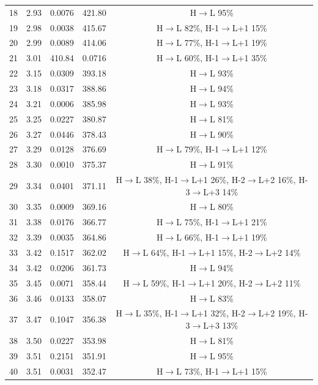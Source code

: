 \begin{table}[H]
{\begin{center}
\begin{tabular}{ccccc}
18 & 2.93 & 0.0076 & 421.80 &  H$\rightarrow$L 95\%  \\ 
19 & 2.98 & 0.0038 & 415.67 & H$\rightarrow$L 82\%, H-1$\rightarrow$L+1 15\% \\ 
20 & 2.99 & 0.0089 & 414.06 &  H$\rightarrow$L 77\%, H-1$\rightarrow$L+1 19\% \\ 
21 & 3.01 & 410.84 & 0.0716 & H$\rightarrow$L 60\%, H-1$\rightarrow$L+1 35\% \\ 
22 & 3.15 & 0.0309 & 393.18 & H$\rightarrow$L 93\% \\ 
23 & 3.18 & 0.0317 & 388.86 & H$\rightarrow$L 94\% \\ 
24 & 3.21 & 0.0006 & 385.98 & H$\rightarrow$L 93\% \\ 
25 & 3.25 & 0.0227 & 380.87 & H$\rightarrow$L 81\% \\ 
26 & 3.27 & 0.0446 & 378.43 & H$\rightarrow$L 90\% \\ 
27 & 3.29 & 0.0128 & 376.69 & H$\rightarrow$L 79\%, H-1$\rightarrow$L+1 12\% \\ 
28 & 3.30 & 0.0010 & 375.37 & H$\rightarrow$L 91\% \\ 
29 & 3.34 & 0.0401 & 371.11 &  H$\rightarrow$L 38\%, H-1$\rightarrow$L+1 26\%, H-2$\rightarrow$L+2 16\%, H-3$\rightarrow$L+3 14\% \\
30 & 3.35 & 0.0009 & 369.16 & H$\rightarrow$L 80\% \\ 
31 & 3.38 & 0.0176 & 366.77 &  H$\rightarrow$L 75\%, H-1$\rightarrow$L+1 21\% \\
32 & 3.39 & 0.0035 & 364.86 &   H$\rightarrow$L 66\%, H-1$\rightarrow$L+1 19\% \\ 
33 & 3.42 & 0.1517 & 362.02 &  H$\rightarrow$L 64\%, H-1$\rightarrow$L+1 15\%,  H-2$\rightarrow$L+2 14\% \\ 
34 & 3.42 & 0.0206 & 361.73 &  H$\rightarrow$L 94\% \\
35 & 3.45 & 0.0071 & 358.44 &  H$\rightarrow$L 59\%, H-1$\rightarrow$L+1 20\%, H-2$\rightarrow$L+2 11\% \\ 
36 & 3.46 & 0.0133 & 358.07 &  H$\rightarrow$L 83\% \\ 
37 & 3.47 & 0.1047 & 356.38 &  H$\rightarrow$L 35\%, H-1$\rightarrow$L+1 32\%,  H-2$\rightarrow$L+2 19\%, H-3$\rightarrow$L+3 13\% \\ 
38 & 3.50 & 0.0227 & 353.98 &  H$\rightarrow$L 81\% \\
39 &  3.51 & 0.2151 & 351.91 &  H$\rightarrow$L 95\% \\ 
40 & 3.51 & 0.0031 & 352.47 &  H$\rightarrow$L 73\%, H-1$\rightarrow$L+1 15\% \\ 

\end{tabular}
\end{center}}
\end{table}
